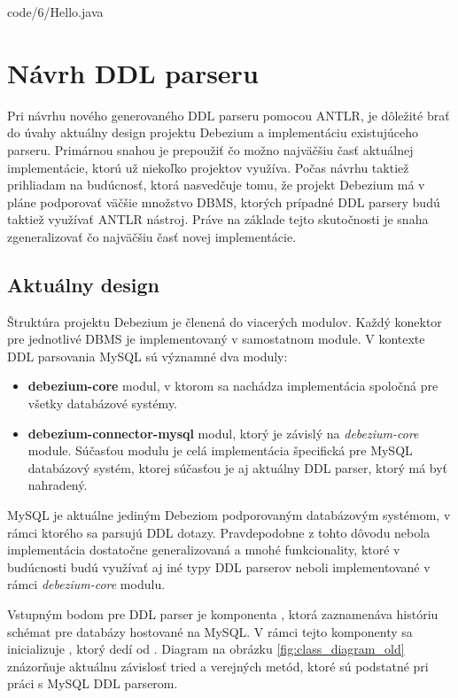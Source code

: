 \begin{minipage}{\linewidth}

            {code/6/Hello.java}
\end{minipage}

\section{Návrh DDL parseru}
Pri návrhu nového generovaného DDL parseru pomocou ANTLR, je dôležité brať do úvahy aktuálny design projektu Debezium a implementáciu existujúceho parseru. Primárnou snahou je prepoužiť čo možno najväčšiu časť aktuálnej implementácie, ktorú už niekoľko projektov využíva. Počas návrhu taktiež prihliadam na budúcnosť, ktorá nasvedčuje tomu, že projekt Debezium má v pláne podporovať väčšie množstvo DBMS, ktorých prípadné DDL parsery budú taktiež využívať ANTLR nástroj. Práve na základe tejto skutočnosti je snaha zgeneralizovať čo najväčšiu časť novej implementácie.

\subsection{Aktuálny design}\label{old_design}
Štruktúra projektu Debezium je členená do viacerých modulov. Každý konektor pre jednotlivé DBMS je implementovaný v samostatnom module. V kontexte DDL parsovania MySQL sú významné dva moduly:
\begin{itemize}
\item \textbf{debezium-core} modul, v ktorom sa nachádza implementácia spoločná pre všetky databázové systémy.
\item \textbf{debezium-connector-mysql} modul, ktorý je závislý na \textit{debezium-core} module. Súčasťou modulu je celá implementácia špecifická pre MySQL databázový systém, ktorej súčasťou je aj aktuálny DDL parser, ktorý má byť nahradený.
\end{itemize}

MySQL je aktuálne jediným Debeziom podporovaným databázovým systémom, v rámci ktorého sa parsujú DDL dotazy. Pravdepodobne z tohto dôvodu nebola implementácia dostatočne generalizovaná a mnohé funkcionality, ktoré v budúcnosti budú využívať aj iné typy DDL parserov neboli implementované v rámci \textit{debezium-core} modulu.

Vstupným bodom pre DDL parser je komponenta , ktorá zaznamenáva históriu schémat pre databázy hostované na MySQL. V rámci tejto komponenty sa inicializuje , ktorý dedí od . Diagram na obrázku \ref{fig:class_diagram_old} znázorňuje aktuálnu závislosť tried a verejných metód, ktoré sú podstatné pri práci s MySQL DDL parserom.

